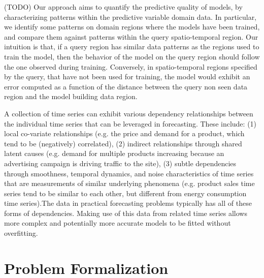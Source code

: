 (TODO) Our approach aims to quantify the predictive quality of models, by characterizing patterns within the predictive variable domain data. In particular, we identify some patterns on domain regions where the models have been trained, and compare them against patterns within the query spatio-temporal region. Our intuition is that, if a query region has similar data patterns as the regions used to train the model, then the behavior of the model on the query region should follow the one observed during training.
Conversely, in spatio-temporal regions specified by the query, that have not been used for training, the model would exhibit an error computed as a function of the distance between the query non seen data region and the model building data region.

A collection of time series can exhibit various dependency relationships between the individual time series that can be leveraged in forecasting. These include: (1) local co-variate relationships (e.g. the price and demand for a product, which tend to be (negatively) correlated), (2) indirect relationships through shared latent causes (e.g. demand for multiple products increasing because an advertising campaign is driving traffic to the site), (3) subtle dependencies through smoothness, temporal dynamics, and noise characteristics of time series that are measurements of similar underlying phenomena (e.g. product sales time series tend to be similar to each other, but different from energy consumption time series).The data in practical forecasting problems typically has all of these forms of dependencies. Making use of this data from related time series allows more complex and potentially more accurate models to be fitted without overfitting.

\section{Problem Formalization}
\label{Sec:ProblemFormalization}

